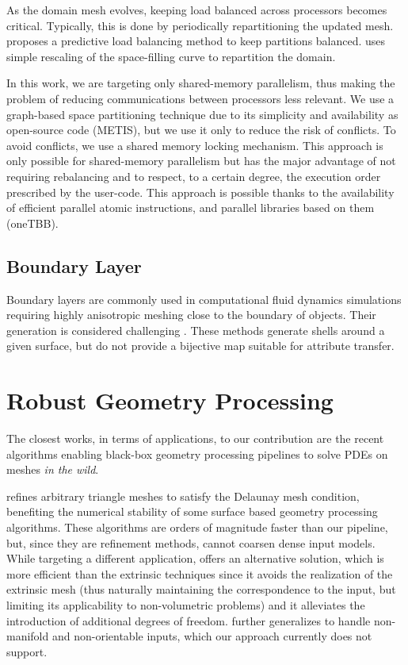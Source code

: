 As the domain mesh evolves, keeping load balanced across processors becomes
critical. Typically, this is done by periodically repartitioning the updated mesh.
\citet{zhou2012tools} proposes a predictive load balancing method to keep
partitions balanced. \citet{marot2019one} uses simple rescaling of the
space-filling curve to repartition the domain.

In this work, we are targeting only shared-memory parallelism, thus making the problem of reducing communications between processors less relevant. We use a graph-based space partitioning technique \cite{karypis1998fast} due to its simplicity and availability as open-source code (METIS), but we use it only to reduce the risk of conflicts. To avoid conflicts, we use a shared memory locking mechanism. This approach is only possible for shared-memory parallelism but has the major advantage of not requiring rebalancing and to respect, to a certain degree, the execution order prescribed by the user-code. This approach is possible thanks to the availability of efficient parallel atomic instructions, and parallel libraries based on them (oneTBB).


\subsection{Boundary Layer}

Boundary layers are commonly used in computational fluid dynamics simulations requiring highly anisotropic meshing close to the boundary of objects. Their generation is considered challenging \cite{aubry2015most,aubry2017boundary,garimella2000boundary}. These methods generate shells around a given surface, but do not provide a bijective map suitable for attribute transfer.

\section{Robust Geometry Processing}

The closest works, in terms of applications, to our contribution are the recent algorithms enabling black-box geometry processing pipelines to solve PDEs on meshes \emph{in the wild}. 

\cite{dyer2007delaunay,liu2015efficient} refines arbitrary triangle meshes to satisfy the Delaunay mesh condition,
benefiting the numerical stability of some surface based geometry processing algorithms.
These algorithms are orders of magnitude faster than our pipeline, but, since they are refinement methods, cannot coarsen dense input models.
%
While targeting a different application, \cite{sharp2019navigating} offers an alternative solution, 
which is more efficient than the extrinsic techniques \cite{liu2015efficient} since it avoids the realization of the extrinsic mesh (thus naturally maintaining the correspondence to the input, but limiting its applicability to non-volumetric problems) and it alleviates the introduction of additional degrees of freedom.
\cite{Sharp:2020:LNT} further generalizes \cite{sharp2019navigating} to handle non-manifold and non-orientable inputs, which our approach currently does not support.


